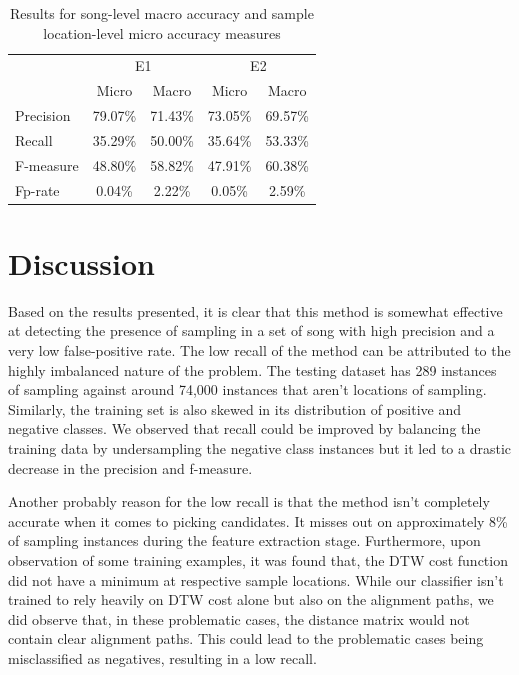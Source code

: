 \documentclass{article}
\begin{document}
\begin{table}[!ht]
\centering
\caption{Results for song-level macro accuracy and sample location-level micro accuracy measures}
\label{results}
\begin{tabular}{l|c|c|c|c|}
\cline{2-5}
                                & \multicolumn{2}{c|}{E1} & \multicolumn{2}{c|}{E2} \\ \cline{2-5} 
                                & Micro      & Macro      & Micro      & Macro      \\ \hline
\multicolumn{1}{|l|}{Precision} & 79.07\%    & 71.43\%    & 73.05\%    & 69.57\%    \\ \hline
\multicolumn{1}{|l|}{Recall}    & 35.29\%    & 50.00\%    & 35.64\%    & 53.33\%    \\ \hline
\multicolumn{1}{|l|}{F-measure} & 48.80\%    & 58.82\%    & 47.91\%    & 60.38\%    \\ \hline
\multicolumn{1}{|l|}{Fp-rate}   & 0.04\%     & 2.22\%     & 0.05\%     & 2.59\%     \\ \hline
\end{tabular}
\end{table}

\section{Discussion}
\label{disc}

Based on the results presented, it is clear that this method is somewhat effective at detecting the presence of sampling in a set of song with high precision and a very low false-positive rate. The low recall of the method can be attributed to the highly imbalanced nature of the problem. The testing dataset has 289 instances of sampling against around 74,000 instances that aren't locations of sampling. Similarly, the training set is also skewed in its distribution of positive and negative classes. We observed that recall could be improved by balancing the training data by undersampling the negative class instances but it led to a drastic decrease in the precision and f-measure. 

Another probably reason for the low recall is that the method isn't completely accurate when it comes to picking candidates. It misses out on approximately 8\% of sampling instances during the feature extraction stage. Furthermore, upon observation of some training examples, it was found that, the DTW cost function did not have a minimum at respective sample locations. While our classifier isn't trained to rely heavily on DTW cost alone but also on the alignment paths, we did observe that, in these problematic cases, the distance matrix would not contain clear alignment paths. This could lead to the problematic cases being misclassified as negatives, resulting in a low recall.
\end{document}
